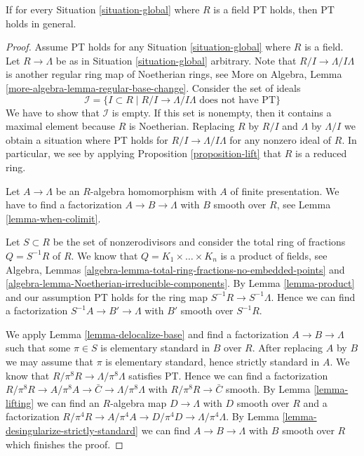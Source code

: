 \begin{lemma}
\label{lemma-reduce-to-field}
If for every Situation \ref{situation-global} where $R$
is a field PT holds, then PT holds in general.
\end{lemma}

\begin{proof}
Assume PT holds for any Situation \ref{situation-global} where $R$ is a field.
Let $R \to \Lambda$ be as in Situation \ref{situation-global} arbitrary.
Note that $R/I \to \Lambda/I\Lambda$ is another regular ring map
of Noetherian rings, see
More on Algebra, Lemma \ref{more-algebra-lemma-regular-base-change}.
Consider the set of ideals
$$
\mathcal{I} = \{I \subset R \mid R/I \to \Lambda/I\Lambda
\text{ does not have PT}\}
$$
We have to show that $\mathcal{I}$ is empty. If this set is nonempty,
then it contains a maximal element because $R$ is Noetherian.
Replacing $R$ by $R/I$ and $\Lambda$ by $\Lambda/I$ we obtain a
situation where PT holds for $R/I \to \Lambda/I\Lambda$ for any
nonzero ideal of $R$. In particular, we see by applying
Proposition \ref{proposition-lift}
that $R$ is a reduced ring.

\medskip\noindent
Let $A \to \Lambda$ be an $R$-algebra homomorphism with $A$ of
finite presentation. We have to find a factorization $A \to B \to \Lambda$
with $B$ smooth over $R$, see Lemma \ref{lemma-when-colimit}.

\medskip\noindent
Let $S \subset R$ be the set of nonzerodivisors and
consider the total ring of fractions $Q = S^{-1}R$ of $R$. We know that
$Q = K_1 \times \ldots \times K_n$ is a product of fields, see
Algebra, Lemmas \ref{algebra-lemma-total-ring-fractions-no-embedded-points} and
\ref{algebra-lemma-Noetherian-irreducible-components}.
By Lemma \ref{lemma-product} and our assumption
PT holds for the ring map $S^{-1}R \to S^{-1}\Lambda$.
Hence we can find a factorization $S^{-1}A \to B' \to \Lambda$
with $B'$ smooth over $S^{-1}R$.

\medskip\noindent
We apply Lemma \ref{lemma-delocalize-base}
and find a factorization $A \to B \to \Lambda$ such that
some $\pi \in S$ is elementary standard in $B$ over $R$.
After replacing $A$ by $B$ we may assume that $\pi$ is
elementary standard, hence strictly standard in $A$. We know that
$R/\pi^8R \to \Lambda/\pi^8\Lambda$ satisfies PT.
Hence we can find a factorization
$R/\pi^8 R \to A/\pi^8A \to \bar C \to \Lambda/\pi^8\Lambda$
with $R/\pi^8 R \to \bar C$ smooth. By
Lemma \ref{lemma-lifting}
we can find an $R$-algebra map $D \to \Lambda$ with $D$ smooth over $R$
and a factorization
$R/\pi^4 R \to A/\pi^4A \to D/\pi^4D \to \Lambda/\pi^4\Lambda$.
By Lemma \ref{lemma-desingularize-strictly-standard}
we can find $A \to B \to \Lambda$ with $B$ smooth over $R$
which finishes the proof.
\end{proof}










